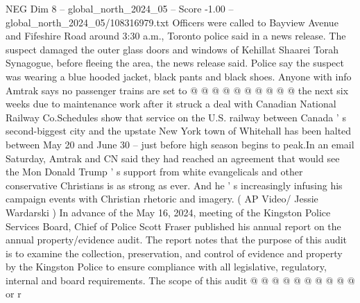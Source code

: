 \begin{textsample}{NEG Dim 8 – global\_north\_2024\_05 – Score -1.00 – global\_north\_2024\_05/108316979.txt}
Officers were called to Bayview Avenue and Fifeshire Road around 3:30 a.m., Toronto police said in a news release.
The suspect damaged the outer glass doors and windows of Kehillat Shaarei Torah Synagogue, before fleeing the area, the news release said.
Police say the suspect was wearing a blue hooded jacket, black pants and black shoes.
Anyone with info Amtrak says no passenger trains are set to @ @ @ @ @ @ @ @ @ @ the next six weeks due to maintenance work after it struck a deal with Canadian National Railway Co.Schedules show that service on the U.S. railway between Canada ' s second-biggest city and the upstate New York town of Whitehall has been halted between May 20 and June 30 -- just before high season begins to peak.In an email Saturday, Amtrak and CN said they had reached an agreement that would see the Mon Donald Trump ' s support from white evangelicals and other conservative Christians is as strong as ever.
And he ' s increasingly infusing his campaign events with Christian rhetoric and imagery. ( AP Video/ Jessie Wardarski ) In advance of the May 16, 2024, meeting of the Kingston Police Services Board, Chief of Police Scott Fraser published his annual report on the annual property/evidence audit.
The report notes that the purpose of this audit is to examine the collection, preservation, and control of evidence and property by the Kingston Police to ensure compliance with all legislative, regulatory, internal and board requirements.
The scope of this audit @ @ @ @ @ @ @ @ @ @ or r

\end{textsample}
